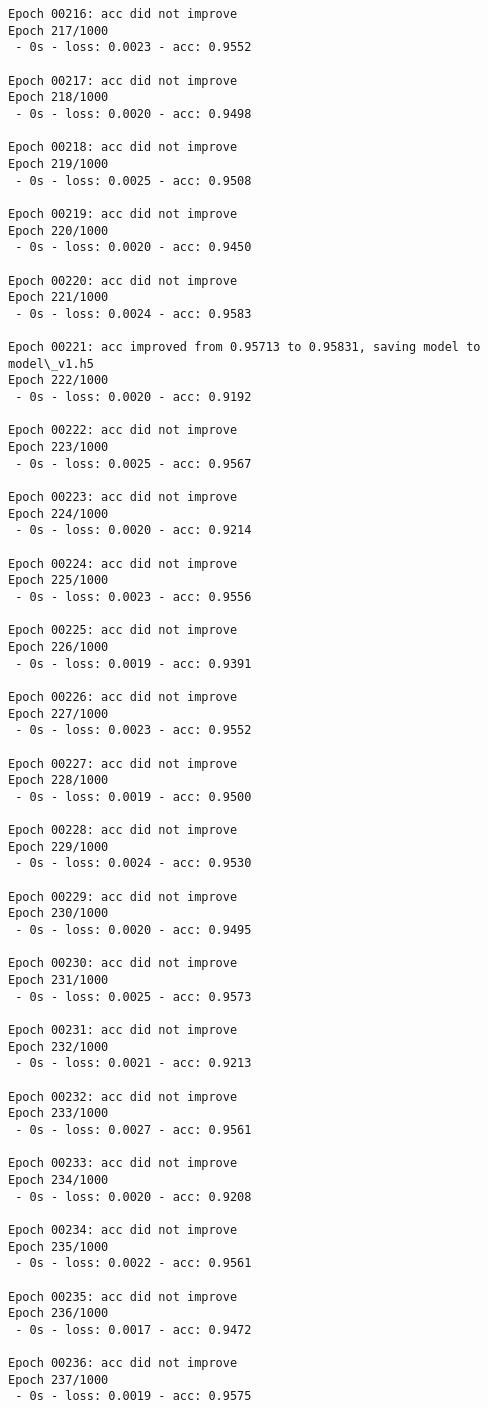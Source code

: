\documentclass[11pt]{article}
\begin{document}
\begin{Verbatim}[commandchars=\\\{\}]
Epoch 00216: acc did not improve
Epoch 217/1000
 - 0s - loss: 0.0023 - acc: 0.9552

Epoch 00217: acc did not improve
Epoch 218/1000
 - 0s - loss: 0.0020 - acc: 0.9498

Epoch 00218: acc did not improve
Epoch 219/1000
 - 0s - loss: 0.0025 - acc: 0.9508

Epoch 00219: acc did not improve
Epoch 220/1000
 - 0s - loss: 0.0020 - acc: 0.9450

Epoch 00220: acc did not improve
Epoch 221/1000
 - 0s - loss: 0.0024 - acc: 0.9583

Epoch 00221: acc improved from 0.95713 to 0.95831, saving model to model\_v1.h5
Epoch 222/1000
 - 0s - loss: 0.0020 - acc: 0.9192

Epoch 00222: acc did not improve
Epoch 223/1000
 - 0s - loss: 0.0025 - acc: 0.9567

Epoch 00223: acc did not improve
Epoch 224/1000
 - 0s - loss: 0.0020 - acc: 0.9214

Epoch 00224: acc did not improve
Epoch 225/1000
 - 0s - loss: 0.0023 - acc: 0.9556

Epoch 00225: acc did not improve
Epoch 226/1000
 - 0s - loss: 0.0019 - acc: 0.9391

Epoch 00226: acc did not improve
Epoch 227/1000
 - 0s - loss: 0.0023 - acc: 0.9552

Epoch 00227: acc did not improve
Epoch 228/1000
 - 0s - loss: 0.0019 - acc: 0.9500

Epoch 00228: acc did not improve
Epoch 229/1000
 - 0s - loss: 0.0024 - acc: 0.9530

Epoch 00229: acc did not improve
Epoch 230/1000
 - 0s - loss: 0.0020 - acc: 0.9495

Epoch 00230: acc did not improve
Epoch 231/1000
 - 0s - loss: 0.0025 - acc: 0.9573

Epoch 00231: acc did not improve
Epoch 232/1000
 - 0s - loss: 0.0021 - acc: 0.9213

Epoch 00232: acc did not improve
Epoch 233/1000
 - 0s - loss: 0.0027 - acc: 0.9561

Epoch 00233: acc did not improve
Epoch 234/1000
 - 0s - loss: 0.0020 - acc: 0.9208

Epoch 00234: acc did not improve
Epoch 235/1000
 - 0s - loss: 0.0022 - acc: 0.9561

Epoch 00235: acc did not improve
Epoch 236/1000
 - 0s - loss: 0.0017 - acc: 0.9472

Epoch 00236: acc did not improve
Epoch 237/1000
 - 0s - loss: 0.0019 - acc: 0.9575


\end{Verbatim}
\end{document}
